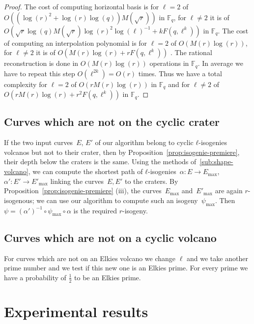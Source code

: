 \documentclass{lms}
\begin{document}
\begin{proof}
The cost of computing horizontal basis is for $\ell=2$ of $O((\log(r)^2+\log(r)\log(q))M(\sqrt{r}))$ in $\mathbb{F}_q$, for $\ell \neq 2$ it is of $O(\sqrt{r}\log(q)M(\sqrt{r})\log(r)^2 \log(\ell)^{-1}+kF(q,\ell^k))$ in $\mathbb{F}_q$.
The cost of computing an interpolation polynomial is for $\ell=2$ of $O(M(r)\log(r))$, for $\ell \neq 2$ it is of $O(M(r)\log(r)+rF(q,\ell^k))$ . The rational reconstruction is done in $O(M(r)\log(r))$ operations in $\mathbb{F}_q$. In average we have to repeat this step $O(\ell^{2k})=O(r)$ times. 
Thus we have a total complexity for $\ell=2$ of  $O(rM(r)\log(r))$ in $\mathbb{F}_q$ and for $\ell \neq 2$ of $O(rM(r)\log(r)+r^2F(q,\ell^k))$ in $\mathbb{F}_q$.
\end{proof}
  
  \subsection{Curves which are not on the cyclic crater}

If the two input curves~$E$, $E'$ of our algorithm
belong to cyclic $ℓ$-isogenies volcanos but not to their crater,
then by Proposition~\ref{prop:isogenie-premiere},
their depth below the craters is the same.
Using the methods of~\ref{sub:shape-volcano},
we can compute the shortest path of $ℓ$-isogenies~$α: E → E_{\max}$,
$α': E' → E'_{\max}$ linking the curves~$E, E'$ to the craters.
By Proposition~\ref{prop:isogenie-premiere} (iii),
the curves~$E_{\max}$ and~$E'_{\max}$ are again $r$-isogenous;
we can use our algorithm to compute such an isogeny~$ψ_{\max}$.
Then $ψ = (α')^{-1} ∘ ψ_{\max} ∘ α$ is the required $r$-isogeny.

  \subsection{Curves which are not on a cyclic volcano}
  For curves which are not on an Elkies volcano we change $\ell$ and we take another prime number and we test if this new one is an Elkies prime. For every prime we have a probability of $\frac{1}{2}$ to be an Elkies prime. 



\section{Experimental results}
\label{sec:implem}
\end{document}
